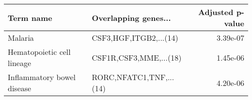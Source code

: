 \begin{tabular}{llr}
\toprule
                 Term name &    Overlapping genes... &  Adjusted p-value \\
\midrule
                   Malaria &  CSF3,HGF,ITGB2,...(14) &          3.39e-07 \\
Hematopoietic cell lineage &  CSF1R,CSF3,MME,...(18) &          1.45e-06 \\
Inflammatory bowel disease & RORC,NFATC1,TNF,...(14) &          4.20e-06 \\
\bottomrule
\end{tabular}
